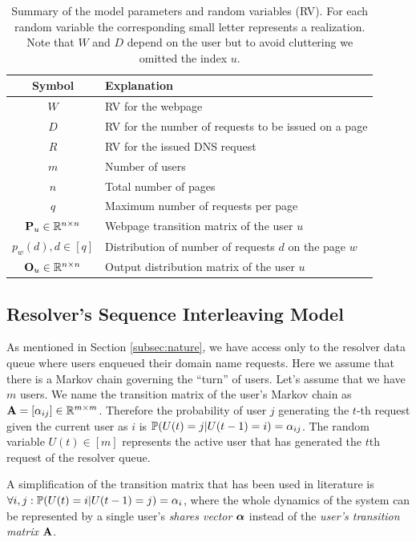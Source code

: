 	\begin{table}
		\centering
		\begin{tabular}{|c|l}
			\hline
			Symbol & Explanation \\ 
			\hline 
			$W$ & RV for the webpage \\ \hline
			$D$ & RV for the number of requests to be issued on a page \\ \hline
			$R$ & RV for the issued DNS request \\ \hline
			\hline 
			$m$ & Number of users \\ \hline
			$n$ & Total number of pages \\ \hline
			$q$ & Maximum number of requests per page \\ \hline 
			\hline 
			$\mathbf{P}_u \in \mathbb R^{n \times n}$ & Webpage transition matrix of the user $u$ \\ \hline 
			$p_w(d), d \in [q]$ & Distribution of number of requests $d$ on the page $w$ \\ \hline 
			$\mathbf{O}_u \in \mathbb R^{n \times n}$ & Output distribution matrix of the user $u$  \\ \hline
		\end{tabular}
		\caption{Summary of the model parameters and random variables (RV). For each random variable the corresponding small letter represents a realization. Note that $W$ and $D$ depend on the user but to avoid cluttering we omitted the index $u$.}
		\label{tab:params}
	\end{table}
	
	\subsection{Resolver's Sequence Interleaving Model}
	\label{subsec:interle}
	As mentioned in Section \ref{subsec:nature}, we have access only to the resolver data queue where users enqueued their domain name requests. 
	Here we assume that there is a Markov chain governing the ``turn'' of users. 
	Let's assume that we have $m$ users.
	We name the transition matrix of the user's Markov chain as $\mathbf{A} = [\alpha_{ij}] \in \mathbb R^{m \times m}$.
	Therefore the probability of user $j$ generating the $t$-th request given the current user as $i$ is $\mathbb{P}(U(t)=j|U(t-1)=i) = \alpha_{ij}$.
	The random variable $U(t) \in [m]$ represents the active user that has generated the $t$th request of the resolver queue. 
	
	A simplification of the transition matrix that has been used in literature is $\forall i, j: \mathbb{P}(U(t) = i|U(t-1) = j) = \alpha_i$, where the whole dynamics of the system can be represented by a single user's \emph{shares vector} $\boldsymbol{\alpha}$ instead of the \emph{user's transition matrix} $\mathbf{A}$.
	
